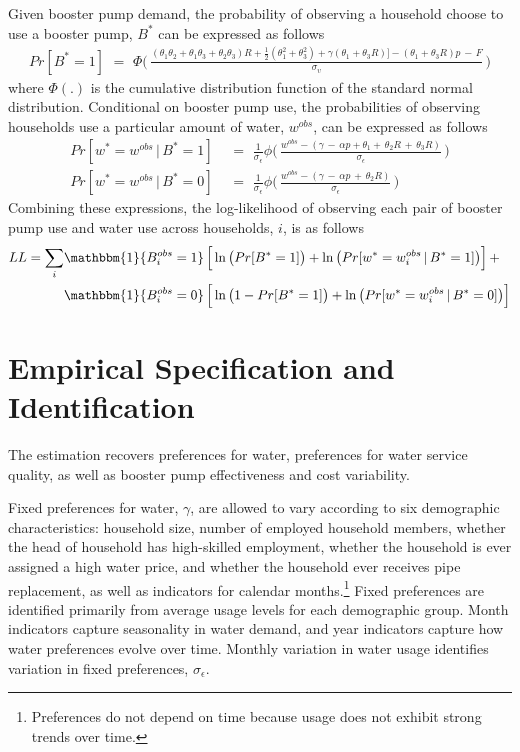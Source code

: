 \documentclass[12pt,table]{article}
\begin{document}
Given booster pump demand, the probability of observing a household choose to use a booster pump, $B^{*}$ can be expressed as follows
\begin{align}
Pr[B^{*}=1] \,\, = \,\, \Phi\Bigg( \, \frac{ (\theta_1 \theta_2 + \theta_1 \theta_3 + \theta_2 \theta_3) R + \frac{1}{2}(\theta_1^2 + \theta_3^2)  + \gamma (\theta_1 + \theta_3 R) \Big] - (\theta_1 + \theta_3 R) p \, - \, F }{\sigma_{\upsilon}} \, \Bigg)
\end{align}
where $\Phi(.)$ is the cumulative distribution function of the standard normal distribution.  Conditional on booster pump use, the probabilities of observing households use a particular amount of water, $w^{obs}$, can be expressed as follows
\begin{align}
Pr[w^{*}=w^{obs} \,|\, B^{*}=1] \,\, &= \,\, \frac{1}{\sigma_{\epsilon}} \phi\Bigg( \, \frac{ w^{obs} - (\gamma \, - \, \alpha p +  \theta_1  + \, \theta_2 R  \,+ \, \theta_3 R )}{\sigma_\epsilon} \, \Bigg) \\
Pr[w^{*}=w^{obs} \,|\, B^{*}=0] \,\, &= \,\, \frac{1}{\sigma_{\epsilon}} \phi\Bigg( \, \frac{ w^{obs} - (\gamma \, - \, \alpha p \, + \, \theta_2 R   )}{\sigma_\epsilon} \, \Bigg)
\end{align}
Combining these expressions, the log-likelihood of observing each pair of booster pump use and water use across households, $i$, is as follows
\begin{align}
\begin{split}
LL = \sum_i & \mathbbm{1}\{ B^{obs}_i = 1 \} \,\Big[ \ln\big( Pr[B^{*}=1] \big) + \ln\big( Pr[w^{*}=w^{obs}_i \,|\, B^{*}=1] \big) \Big] \, + \\
 & \mathbbm{1}\{ B^{obs}_i = 0 \} \,\Big[ \ln\big( 1- Pr[B^{*}=1] \big) + \ln\big( Pr[w^{*}=w^{obs}_i \,|\, B^{*}=0] \big) \Big] 
 \end{split}
\end{align}


\section{Empirical Specification and Identification}

The estimation recovers preferences for water, preferences for water service quality, as well as booster pump effectiveness and cost variability.

Fixed preferences for water, $\gamma$, are allowed to vary according to six demographic characteristics: household size, number of employed household members, whether the head of household has high-skilled employment, whether the household is ever assigned a high water price, and whether the household ever receives pipe replacement, as well as indicators for calendar months.\footnote{Preferences do not depend on time because usage does not exhibit strong trends over time.}  Fixed preferences are identified primarily from average usage levels for each demographic group. Month indicators capture seasonality in water demand, and year indicators capture how water preferences evolve over time.  Monthly variation in water usage identifies variation in fixed preferences, $\sigma_{\epsilon}$.
\end{document}
